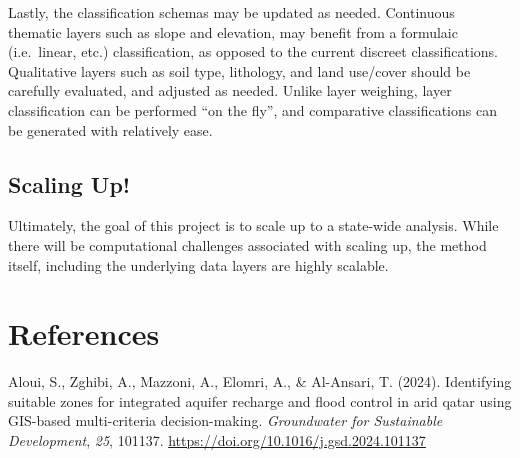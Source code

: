 \documentclass[
]{agujournal2019}
\newlength{\cslhangindent}
\newenvironment{CSLReferences}[2] %
 {\begin{list}{}{%
  \setlength{\itemindent}{0pt}
  \setlength{\leftmargin}{0pt}
  \setlength{\parsep}{0pt}
  \ifodd #1
   \setlength{\leftmargin}{\cslhangindent}
   \setlength{\itemindent}{-1\cslhangindent}
  \fi
  \setlength{\itemsep}{#2\baselineskip}}}
 {\end{list}}
\begin{document}
Lastly, the classification schemas may be updated as needed. Continuous
thematic layers such as slope and elevation, may benefit from a
formulaic (i.e.~linear, etc.) classification, as opposed to the current
discreet classifications. Qualitative layers such as soil type,
lithology, and land use/cover should be carefully evaluated, and
adjusted as needed. Unlike layer weighing, layer classification can be
performed ``on the fly'', and comparative classifications can be
generated with relatively ease.

\subsection{Scaling Up!}\label{scaling-up}

Ultimately, the goal of this project is to scale up to a state-wide
analysis. While there will be computational challenges associated with
scaling up, the method itself, including the underlying data layers are
highly scalable.

\section*{References}\label{references}

\label{refs}
\begin{CSLReferences}{1}{0}
\vspace{1em}

Aloui, S., Zghibi, A., Mazzoni, A., Elomri, A., \& Al-Ansari, T. (2024).
Identifying suitable zones for integrated aquifer recharge and flood
control in arid qatar using GIS-based multi-criteria decision-making.
\emph{Groundwater for Sustainable Development}, \emph{25}, 101137.
\url{https://doi.org/10.1016/j.gsd.2024.101137}

\end{CSLReferences}
\end{document}
